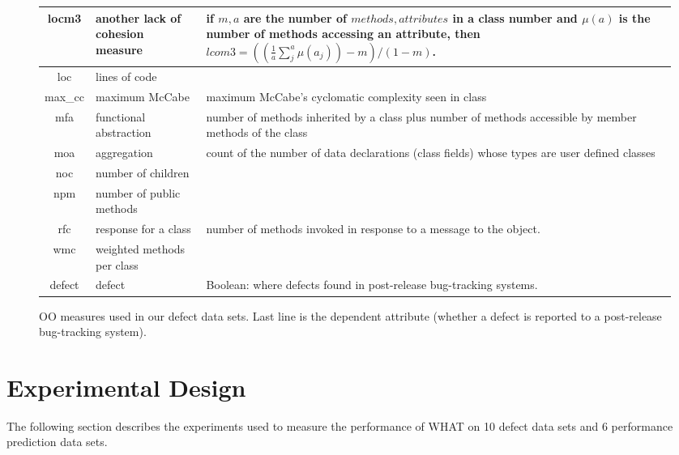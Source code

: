 \documentclass[conference]{IEEEtran}
\begin{document}
\begin{figure*}[htbp!]
\begin{center}
{\begin{tabular}{c|l|p{4.7in}}
        locm3 & another lack of cohesion measure & if $m,a$ are  the number of
        $methods,attributes$
        in a class number and $\mu(a)$  is the number of methods accessing an
        attribute, 
        then
        $lcom3=((\frac{1}{a} \sum_j^a \mu(a_j)) - m)/ (1-m)$.
        \\\hline
        loc & lines of code &\\\hline
        max\_cc & maximum McCabe & maximum McCabe's cyclomatic complexity seen
        in class\\\hline
        mfa & functional abstraction & number of methods inherited by a class
        plus number of methods accessible by member methods of the
        class\\\hline
        moa &  aggregation &  count of the number of data declarations (class
        fields) whose types are user defined classes\\\hline
        noc &  number of children &\\\hline
        npm & number of public methods & \\\hline
        rfc & response for a class &number of  methods invoked in response to
        a message to the object.\\\hline
        wmc & weighted methods per class &\\\hline
        \rowcolor{lightgray}
        defect & defect & Boolean: where defects found in post-release bug-tracking systems.
      \end{tabular}
    }
  \end{center}
  \caption{OO measures used in our defect data sets.  Last line is
    the dependent attribute (whether a defect is reported to  a
    post-release bug-tracking system).}\label{fig:ck}
\end{figure*}

\section{Experimental Design}
The following section describes the experiments used to measure the performance of WHAT on 10 defect data sets and 6 performance prediction data sets.
\end{document}
